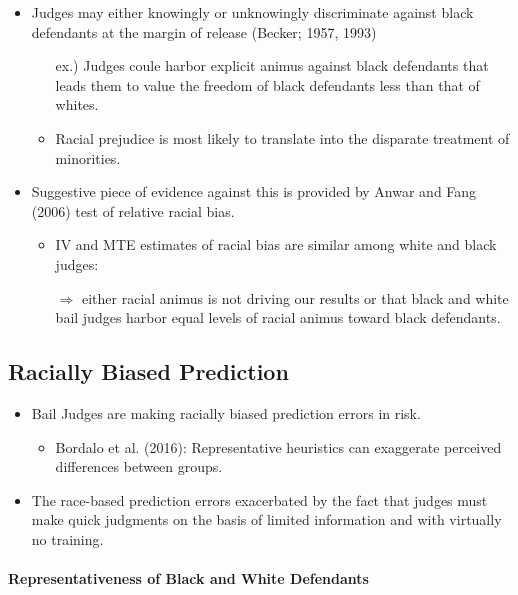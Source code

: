 \documentclass[../root]{subfiles}
\begin{document}
    \begin{itemize}
      \item Judges may either knowingly or unknowingly discriminate against black defendants at the margin of release (Becker; 1957, 1993)
      \begin{itemize}
        \item[ex.)] Judges coule harbor explicit animus against black defendants that leads them to value the freedom of black defendants less than that of whites.
        \item Racial prejudice is most likely to translate into the disparate treatment of minorities.
      \end{itemize}
      \item Suggestive piece of evidence against this is provided by Anwar and Fang (2006) test of relative racial bias.
      \begin{itemize}
        \item IV and MTE estimates of racial bias are similar among white and black judges:

        $\Rightarrow$ either racial animus is not driving our results or that black and white bail judges harbor equal levels of racial animus toward black defendants.
      \end{itemize}
    \end{itemize}

    \subsection{Racially Biased Prediction}

    \begin{itemize}
      \item Bail Judges are making racially biased prediction errors in risk.
      \begin{itemize}
        \item Bordalo et al. (2016): Representative heuristics can exaggerate perceived differences between groups.
      \end{itemize}
      \item The race-based prediction errors exacerbated by the fact that judges must make quick judgments on the basis of limited information and with virtually no training.
    \end{itemize}

    \paragraph{Representativeness of Black and White Defendants}
\end{document}

